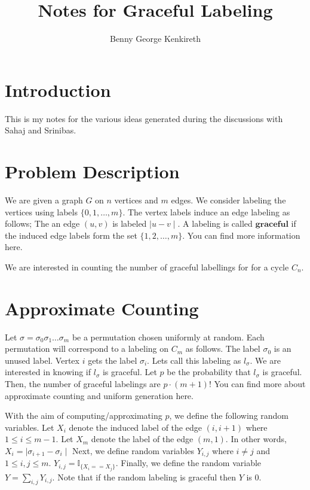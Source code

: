 \documentclass[letterpaper, 12pt]{article}
\let\b\mathbf
\newcommand{\I}{\mathbb{I}}	%
\newcommand{\1}{\mathds{1}}	%
\theoremstyle{definition}
\begin{document}
\title{Notes for Graceful Labeling }
\author{Benny George Kenkireth}
\date{}
\maketitle


\section{Introduction}
This is my notes for the various ideas generated during the discussions with Sahaj and Srinibas.
\section{Problem Description}
We are given a graph $G$ on $n$ vertices and $m$ edges. We consider labeling the vertices using labels $\{0,1, \ldots , m\}$. The vertex labels induce an edge labeling as follows; The an edge $(u,v)$ is labeled $\mid u -v \mid$. A labeling is called $\b{graceful}$ if the induced edge labels form the set $\{1,2,\dots,m\}$. You can find more information here.\cite{articleRosa}\cite{kintali2009graceful}


We are interested in counting the number of graceful labellings for for a cycle $C_{n}$.


\section{Approximate Counting}
Let $\sigma = \sigma_{0}\sigma_{1}\ldots\sigma_{m}$ be a permutation chosen uniformly at random. Each permutation will correspond to a labeling on $C_{m}$ as follows. The label $\sigma_{0}$ is an unused label. Vertex $i$ gets the label $\sigma_{i}$. Lets call this labeling as $l_{\sigma}$. We are interested in knowing if $l_{\sigma}$ is graceful. Let $p$ be the probability that $l_{\sigma}$ is graceful. Then, the number of graceful labelings are $p\cdot(m+1)! $ You can find more about approximate counting and uniform generation here\cite{DBLP:journals/iandc/SinclairJ89}.


With the aim of computing/approximating  $p$, we define the following random variables. Let $X_{i}$ denote the induced label of the edge $(i,i+1)$ where $1\leq i\leq m-1 $. Let $X_{m}$ denote the label of the edge $(m,1)$. In other words, $X_{i} =\mid\sigma_{i+1}-\sigma_{i}\mid$ Next, we define random variables $Y_{i,j}$ where $i \neq j$ and $1\leq i,j \leq m$. $Y_{i,j} = \I_{\{X_{i}==X_{j}\}}$. Finally, we define the random variable  $\displaystyle Y = \sum_{i,j}Y_{i,j}$. Note that if the random labeling is graceful then $Y$ is $0$.
\end{document}
